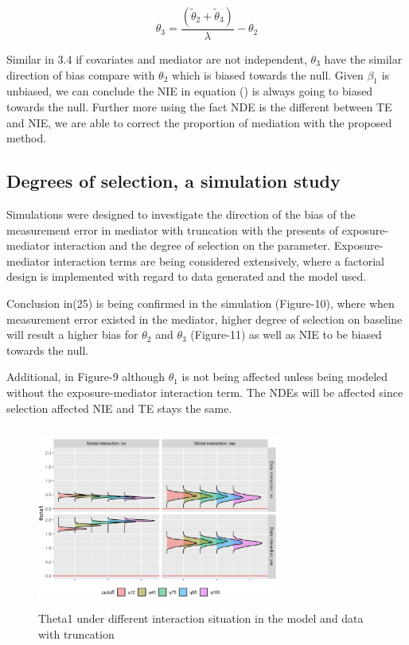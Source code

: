 \documentclass{article}
\begin{document}
\begin{equation}
\theta_3 = \frac{(\tilde \theta_2 + \tilde \theta_3)}{\lambda} - \theta_2
\end{equation}


Similar in 3.4 if covariates and mediator are not independent, $\theta_3$ have the similar direction of bias compare with $\theta_2$ which is biased towards the null. Given $\beta_1$ is unbiased, we can conclude the NIE in equation () is always going to biased towards the null. Further more using the fact NDE is the different between TE and NIE, we are able to correct the proportion of mediation with the proposed method. 

\subsection{Degrees of selection, a simulation study }

Simulations were designed to investigate the direction of the bias of the measurement error in mediator with truncation with the presents of exposure-mediator interaction and the degree of selection on the parameter. Exposure-mediator interaction terms are being considered extensively, where a factorial design is implemented with regard to data generated and the model used. 

Conclusion in(25) is being confirmed in the simulation (Figure-10), where when measurement error existed in the mediator, higher degree of selection on baseline will result a higher bias for $\theta_2$ and $\theta_3$ (Figure-11) as well as NIE to be biased towards the null.

Additional, in Figure-9 although $\theta_1$ is not being affected unless being modeled without the exposure-mediator interaction term. The NDEs will be affected since selection affected NIE and TE stays the same.

\begin{figure}[h]
\centering
\includegraphics[width = 8cm,height = 6cm]{figure-7.png}
\caption{Theta1 under different interaction situation in the model and data with truncation}
\label{fig7}
\end{figure}
\end{document}
